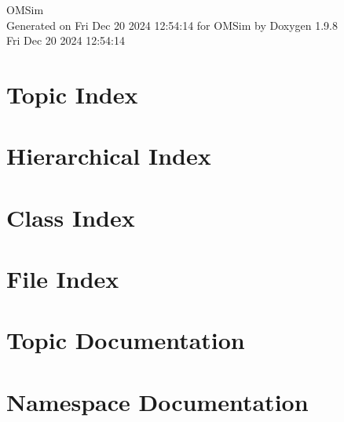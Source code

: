 \documentclass[twoside]{book}
\newcommand{\+}{\discretionary{\mbox{\scriptsize$\hookleftarrow$}}{}{}}
\newcommand{\clearemptydoublepage}{%
    \newpage{\pagestyle{empty}\cleardoublepage}%
  }
\begin{document}
  \raggedbottom
    \hypersetup{pageanchor=false,
                bookmarksnumbered=true,
                pdfencoding=unicode
               }
  \begin{titlepage}
  \vspace*{7cm}
  \begin{center}%
  {\Large OMSim}\\
  \vspace*{1cm}
  {\large Generated on Fri Dec 20 2024 12\+:54\+:14 for OMSim by Doxygen 1.9.8}\\
    \vspace*{0.5cm}
    {\small Fri Dec 20 2024 12:54:14}
  \end{center}
  \end{titlepage}
  \clearemptydoublepage
  \tableofcontents
  \clearemptydoublepage
  \hypersetup{pageanchor=true}








\chapter{Topic Index}

\chapter{Hierarchical Index}

\chapter{Class Index}

\chapter{File Index}

\chapter{Topic Documentation}




\chapter{Namespace Documentation}



\end{document}

